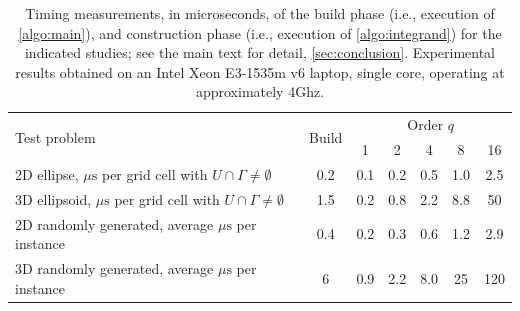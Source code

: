 \documentclass[onefignum,onetabnum,onealgnum,oneeqnum]{siamart190516}
\begin{document}
\begin{table}%
\centering\footnotesize%
\begin{tabular}{lcccccc} \hline
\multirow{2}{*}{Test problem} & \multirow{2}{*}{Build} &  \multicolumn{5}{c}{Order $q$} \\
 &  & 1 & 2 & 4 & 8 & 16 \\ \hline
2D ellipse, $\mu\text{s}$ per grid cell with $U \cap \Gamma \neq \emptyset$ & 0.2 & 0.1 & 0.2 & 0.5 & 1.0 & 2.5 \\
3D ellipsoid, $\mu\text{s}$ per grid cell with $U \cap \Gamma \neq \emptyset$ & 1.5 & 0.2 & 0.8 & 2.2 & 8.8 & 50 \\
2D randomly generated, average $\mu\text{s}$ per instance  & 0.4 & 0.2 & 0.3 & 0.6 & 1.2 & 2.9 \\
3D randomly generated, average $\mu\text{s}$ per instance & 6 & 0.9 & 2.2 & 8.0 & 25 & 120 \\ \hline
\end{tabular}
\caption{Timing measurements, in microseconds, of the build phase (i.e., execution of \cref{algo:main}), and construction phase (i.e., execution of \cref{algo:integrand}) for the indicated studies; see the main text for detail, \cref{sec:conclusion}. Experimental results obtained on an Intel Xeon E3-1535m v6 laptop, single core, operating at approximately 4Ghz.}%
%
\label{tab:timing}\vspace{-2em}%
\end{table}
\end{document}
